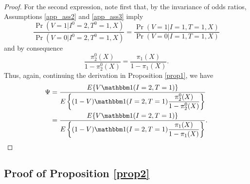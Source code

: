 \begin{appendix}
\begin{proof}
    For the second expression, note first that, by the invariance of odds ratios, Assumptions \ref{app_ass2} and \ref{app_ass3} imply
    \begin{equation*}
        \dfrac{\Pr(V = 1 | I^0 = 2, T^0=1, X)}{\Pr(V = 0 | I^0 = 2, T^0=1, X)} = \dfrac{\Pr(V = 1 | I = 1, T=1, X)}{\Pr(V = 0 | I = 1, T=1, X)}
    \end{equation*}
    and by consequence 
    \begin{equation*}
        \dfrac{\pi^0_2(X)}{1 - \pi^0_2(X)} = \dfrac{\pi_1(X)}{1 - \pi_1(X)}.
    \end{equation*}
    Thus, again, continuing the derivation in Proposition \ref{prop1}, we have 
    \begin{align*}
        \Psi &= \dfrac{E\{V \mathbbm 1 (I = 2, T=1)\}}{E\left\{(1 - V)\mathbbm 1 (I = 2, T=1) \dfrac{\pi^0_2(X)}{1-\pi^0_2(X)}\right\}} \\
        &= \dfrac{E\{V \mathbbm 1 (I = 2, T=1)\}}{E\left\{(1 - V)\mathbbm 1 (I = 2, T=1) \dfrac{\pi_1(X)}{1-\pi_1(X)}\right\}}.
    \end{align*}
    \end{proof}
    \newpage

    \subsection{Proof of Proposition \ref{prop2}}\label{sec:proof2}
    

\end{appendix}
